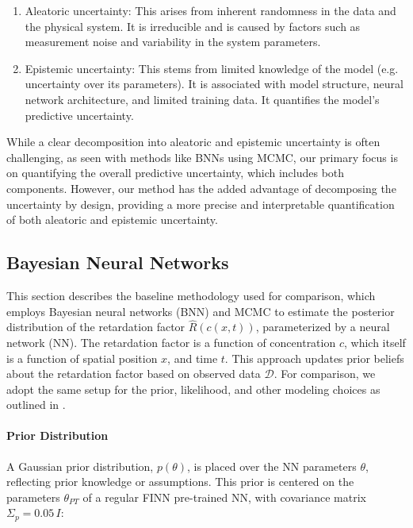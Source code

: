 \begin{enumerate}
    \item Aleatoric uncertainty: This arises from inherent randomness in the data and the physical system. It is irreducible and is caused by factors such as measurement noise and variability in the system parameters.
    \item Epistemic uncertainty: This stems from limited knowledge of the model (e.g. uncertainty over its parameters). It is associated with model structure, neural network architecture, and limited training data. It quantifies the model's predictive uncertainty.
\end{enumerate}

While a clear decomposition into aleatoric and epistemic uncertainty is often challenging, as seen with methods like BNNs using MCMC, our primary focus is on quantifying the overall predictive uncertainty, which includes both components. However, our method has the added advantage of decomposing the uncertainty by design, providing a more precise and interpretable quantification of both aleatoric and epistemic uncertainty.





\subsection{Bayesian Neural Networks}
\label{sec:bayes_nn}
This section describes the baseline methodology used for comparison, which employs Bayesian neural networks (BNN) and MCMC to estimate the posterior distribution of the retardation factor $\hat{R}(c(x,t))$, parameterized by a neural network (NN). The retardation factor is a function of concentration $c$, which itself is a function of spatial position $x$, and time $t$. This approach updates prior beliefs about the retardation factor based on observed data $\mathcal{D}$.
For comparison, we adopt the same setup for the prior, likelihood, and other modeling choices as outlined in \cite{finn}.

\paragraph{Prior Distribution}

A Gaussian prior distribution, $p(\theta)$, is placed over the NN parameters $\theta$, reflecting prior knowledge or assumptions. This prior is centered on the parameters $\theta_{PT}$ of a regular FINN pre-trained NN, with covariance matrix $\Sigma_p = 0.05 \, I$:


